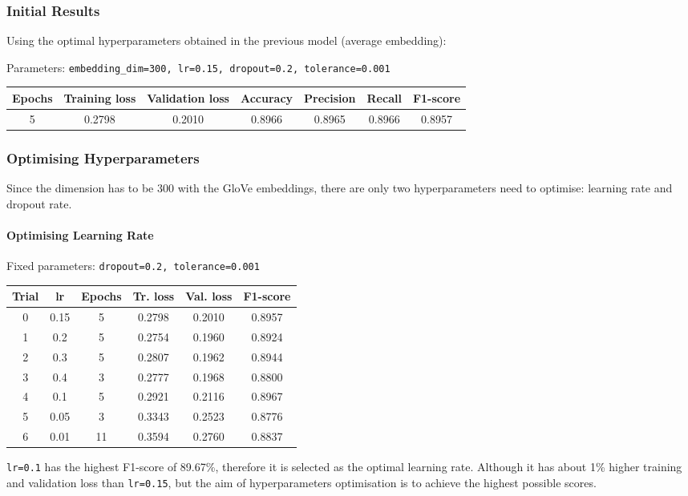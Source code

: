 \documentclass[11pt]{article}
\begin{document}
\hypertarget{initial-results}{%
\subsubsection{Initial Results}\label{initial-results}}

Using the optimal hyperparameters obtained in the previous model
(average embedding):

Parameters:
\texttt{embedding\_dim=300,\ lr=0.15,\ dropout=0.2,\ tolerance=0.001}

\begin{longtable}[]{@{}ccccccc@{}}
\toprule
Epochs & Training loss & Validation loss & Accuracy & Precision & Recall
& F1-score\tabularnewline
\midrule
\endhead
5 & 0.2798 & 0.2010 & 0.8966 & 0.8965 & 0.8966 & 0.8957\tabularnewline
\bottomrule
\end{longtable}

\hypertarget{optimising-hyperparameters}{%
\subsubsection{Optimising
Hyperparameters}\label{optimising-hyperparameters}}

Since the dimension has to be 300 with the GloVe embeddings, there are
only two hyperparameters need to optimise: learning rate and dropout
rate.

\hypertarget{optimising-learning-rate}{%
\paragraph{Optimising Learning Rate}\label{optimising-learning-rate}}

Fixed parameters: \texttt{dropout=0.2,\ tolerance=0.001}

\begin{longtable}[]{@{}cccccc@{}}
\toprule
Trial & lr & Epochs & Tr. loss & Val. loss & F1-score\tabularnewline
\midrule
\endhead
0 & 0.15 & 5 & 0.2798 & 0.2010 & 0.8957\tabularnewline
1 & 0.2 & 5 & 0.2754 & 0.1960 & 0.8924\tabularnewline
2 & 0.3 & 5 & 0.2807 & 0.1962 & 0.8944\tabularnewline
3 & 0.4 & 3 & 0.2777 & 0.1968 & 0.8800\tabularnewline
4 & 0.1 & 5 & 0.2921 & 0.2116 & 0.8967\tabularnewline
5 & 0.05 & 3 & 0.3343 & 0.2523 & 0.8776\tabularnewline
6 & 0.01 & 11 & 0.3594 & 0.2760 & 0.8837\tabularnewline
\bottomrule
\end{longtable}

\texttt{lr=0.1} has the highest F1-score of 89.67\%, therefore it is
selected as the optimal learning rate. Although it has about 1\% higher
training and validation loss than \texttt{lr=0.15}, but the aim of
hyperparameters optimisation is to achieve the highest possible scores.
\end{document}
